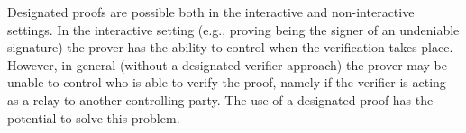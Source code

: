 	Designated proofs are possible both in the interactive and non-interactive settings.
	In the interactive setting (e.g., proving being the signer of an undeniable signature) the prover has the ability to control when the verification takes place.
	However, in general (without a designated-verifier approach) the prover may be unable to control who 
is able to verify the proof, namely if the verifier is acting as a relay to another controlling party.
	The use of a designated proof has the potential to solve this problem.

	

